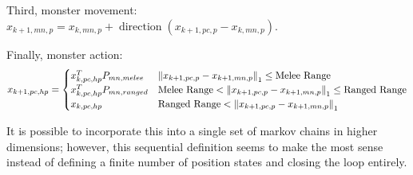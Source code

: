 \documentclass[9pt, onecolumn]{report}
\begin{document}
Third, monster movement: $x_{k+1,mn,p} = x_{k,mn,p} + \operatorname{direction}(x_{k+1,pc,p} - x_{k,mn,p})$.

Finally, monster action:\[
    x_{k+1,pc,hp} = \begin{cases}
        x_{k,pc,hp}^T P_{mn,melee}  & \norm{x_{k+1,pc,p} - x_{k+1,mn,p}}_1 \leq \text{Melee Range}\\
        x_{k,pc,hp}^T P_{mn,ranged} & \text{Melee Range} < \norm{x_{k+1,pc,p} - x_{k+1,mn,p}}_1 \leq \text{Ranged Range}\\
        x_{k,pc,hp} & \text{Ranged Range} < \norm{x_{k+1,pc,p} - x_{k+1,mn,p}}_1
    \end{cases}
\]

It is possible to incorporate this into a single set of markov chains in higher dimensions; however, this sequential definition seems to make the most sense instead of defining a finite number of position states and closing the loop entirely.













% 
% 
\end{document}
